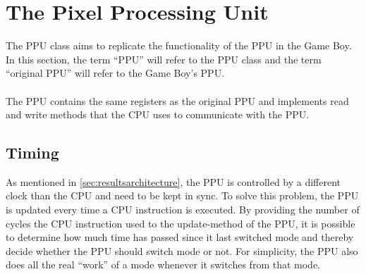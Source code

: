 
\section{The Pixel Processing Unit}
The PPU class aims to replicate the functionality of the PPU in the Game Boy. In this section, the term ``PPU'' will refer to the PPU class and the term ``original PPU'' will refer to the Game Boy's PPU.\\
\\
The PPU contains the same registers as the original PPU and implements read and write methods that the CPU uses to communicate with the PPU.

\subsection{Timing}
As mentioned in \ref{sec:resultsarchitecture}, the PPU is controlled by a different clock than the CPU and need to be kept in sync. To solve this problem, the PPU is updated every time a CPU instruction is executed. By providing the number of cycles the CPU instruction used to the update-method of the PPU, it is possible to determine how much time has passed since it last switched mode and thereby decide whether the PPU should switch mode or not. For simplicity, the PPU also does all the real ``work'' of a mode whenever it switches from that mode.

